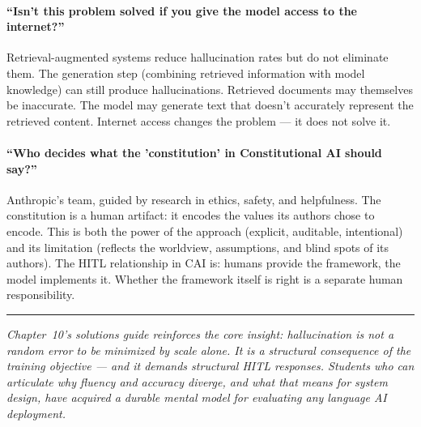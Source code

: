 \paragraph{``Isn't this problem solved if you give the model access to the internet?''}
Retrieval-augmented systems reduce hallucination rates but do not eliminate them. The generation step (combining retrieved information with model knowledge) can still produce hallucinations. Retrieved documents may themselves be inaccurate. The model may generate text that doesn't accurately represent the retrieved content. Internet access changes the problem --- it does not solve it.

\paragraph{``Who decides what the 'constitution' in Constitutional AI should say?''}
Anthropic's team, guided by research in ethics, safety, and helpfulness. The constitution is a human artifact: it encodes the values its authors chose to encode. This is both the power of the approach (explicit, auditable, intentional) and its limitation (reflects the worldview, assumptions, and blind spots of its authors). The HITL relationship in CAI is: humans provide the framework, the model implements it. Whether the framework itself is right is a separate human responsibility.

\bigskip
\begin{center}
\rule{0.5\textwidth}{0.4pt}
\end{center}
\bigskip

\noindent\textit{Chapter~10's solutions guide reinforces the core insight: hallucination is not a random error to be minimized by scale alone. It is a structural consequence of the training objective --- and it demands structural HITL responses. Students who can articulate why fluency and accuracy diverge, and what that means for system design, have acquired a durable mental model for evaluating any language AI deployment.}
